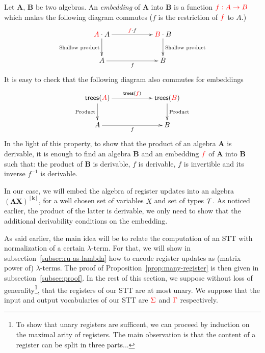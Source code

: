 Let $\mathbf{A}$, $\mathbf{B}$ be two algebras. An \emph{embedding} of $\mathbf{A}$ into $\mathbf{B}$ is a function ${\color{red}{f: {\color{red}{A}}\to {\color{red}{B}}}}$ which makes the following diagram commutes ($f$ is the restriction of ${\color{red}{f}}$ to $A$.)
      \begin{align*}
    \xymatrix@C=2cm{
        \ranked{A} \cdot A \ar[r]^{\ranked{f}\cdot f} \ar[d]_{\text{Shallow product}} & \ranked{B}\cdot B \ar[d]^{\text{Shallow product}}\\
A \ar[r]_{f} & B       
       }
    \end{align*} 
It is easy to check that the following diagram also commutes for embeddings    
        \begin{align*}
    \xymatrix@C=2cm{
        \trees(\ranked{A}) \ar[r]^{\trees(\ranked{f})} \ar[d]_{\text{Product}} & \trees(\ranked{B}) \ar[d]^{\text{Product}}\\
A \ar[r]_{f} & B       
       }
    \end{align*}  
 In the light of this property, to show that the product of an algebra $\mathbf{A}$ is derivable, it is enough to find an algebra $\mathbf{B}$ and an embedding ${\color{red}{f}}$ of $\mathbf{A}$ into $\mathbf{B}$ such that:  
the product of $\mathbf{B}$ is derivable, $f$ is derivable, $f$ is invertible and its inverse $f^{-1}$ is derivable.  

In our case, we will embed the algebra of register updates into an algebra $\mathbf{(\Lambda X)^{[k]}}$, for a well chosen set of variables $X$ and set of types ${\mathcal T}$. As noticed earlier, the product of the latter is derivable, we only need to show that the additional derivability conditions on the embedding.



\newpage
As said earlier, the main idea will be to relate the computation of an STT with normalization of a certain $\lambda$-term. For that, we will show in subsection~\ref{subsec:ru-as-lambda} how to encode register updates as (matrix power of) $\lambda$-terms. The proof of Proposition~\ref{prop:many-register} is then given in subsection~\ref{subsec:proof}. In the rest of this section, we suppose without loss of generality\footnote{To show that unary registers are sufficent, we can proceed by induction on the maximal arity of registers. The main observation is  that the content of a register can be split in three parts...}, that the registers of our STT are at most unary. We suppose that the input and output vocabularies of our STT are ${\color{red}{\Sigma}}$ and ${\color{red}{\Gamma}}$ respectively. 

